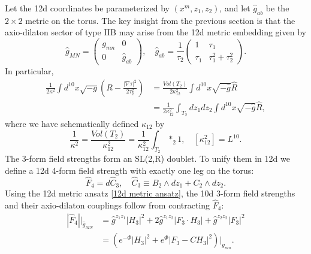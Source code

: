 Let the 12d coordinates be parameterized by $(x^m,z_1,z_2)$, and let $\hat{g}_{ab}$ be the $2\times 2$ metric on the torus.
The key insight from the previous section is that the axio-dilaton sector of type IIB may arise from the 12d metric embedding given by
\begin{equation}
\hat{g}_{MN}=\begin{pmatrix}
g_{mn} & 0 \\
0 &\hat{g}_{ab}
\end{pmatrix},\quad
\hat{g}_{ab}
=\frac{1}{\tau_2}\begin{pmatrix}
1& \tau_1\\
\tau_1 & \tau_1^2+\tau_2^2
\end{pmatrix}.
\label{12d metric ansatz}
\end{equation}
In particular,
\begin{equation}
\begin{aligned}
\frac{1}{2\kappa^2}\int d^{10}x\sqrt{-g}\left(
R - \frac{|\nabla \tau|^2}{2\tau_2^2}
\right)
&=
\frac{Vol(T_2)}{2\kappa_{12}^2}\int d^{10}x \sqrt{-\hat{g}} \hat{R}\\
&=\frac{1}{2\kappa_{12}^2}\int_{T_2}dz_1 dz_2\int d^{10}x\sqrt{-\hat{g}}\hat{R},
\end{aligned}
\label{axio-dilaton 12d uplift}
\end{equation}
where we have schematically defined $\kappa_{12}$ by 
\begin{equation}
\frac{1}{\kappa^2} = \frac{Vol(T_2)}{\kappa_{12}^2}
=\frac{1}{\kappa_{12}^2}\int_{T_2}*_2 1,\quad
[\kappa_{12}^2] = L^{10}.
\end{equation}
The 3-form field strengths form an SL(2,R) doublet. 
To unify them in 12d we define a 12d 4-form field strength with exactly one leg on the torus:
\begin{equation}
\hat{F}_4=d\hat C_3,\quad
\hat C_3 \equiv B_2\wedge dz_1 + C_2\wedge dz_2.
\end{equation}
Using the 12d metric ansatz \eqref{12d metric ansatz}, the 10d 3-form field strengths and their axio-dilaton couplings follow from contracting $\hat F_4$:
\begin{equation}
\begin{aligned}
|\hat{F}_4|\bigg|_{\hat{g}_{MN}}
&=\hat{g}^{z_1 z_1}|H_3|^2+2\hat{g}^{z_1 z_2}|F_3\cdot H_3|+\hat{g}^{z_2 z_2}|F_3|^2\\
&=\left(
e^{-\Phi}|H_3|^2 + e^\Phi|F_3-CH_3|^2
\right)\bigg|_{g_{mn}}.
\end{aligned}
\end{equation}

